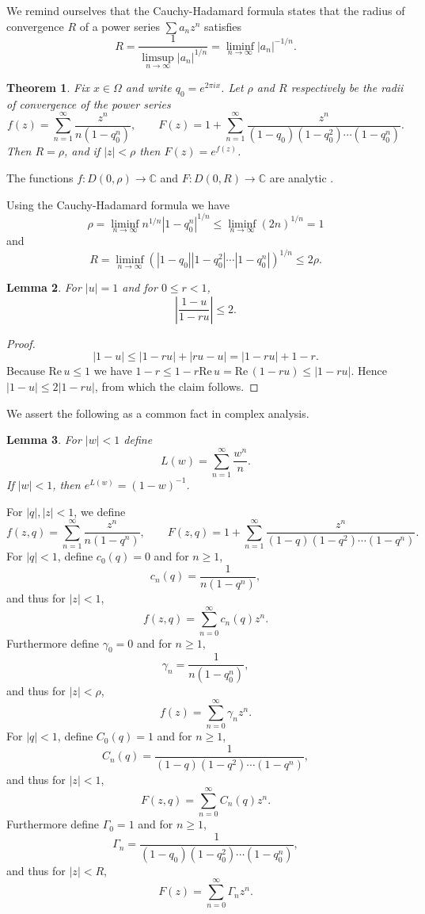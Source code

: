 \documentclass{amsart}
\def\Re{\ensuremath{\mathrm{Re}}\,}
\newtheorem{theorem}{Theorem}
\newtheorem{lemma}[theorem]{Lemma}
\begin{document}
We remind ourselves that the Cauchy-Hadamard formula states that the radius of
convergence $R$ of a  power series $\sum a_n z^n$ satisfies
\[
R =\frac{1}{\limsup_{n \to \infty} |a_n|^{1/n}} =  \liminf_{n \to \infty} |a_n|^{-1/n}.
\]


\begin{theorem}
Fix $x \in \Omega$ and write $q_0=e^{2\pi ix}$. Let $\rho$ and $R$ respectively be   the radii of convergence of the power series
\[
f(z) = \sum_{n=1}^\infty \frac{z^n}{n(1-q_0^n)},\qquad F(z) = 1 + \sum_{n=1}^\infty \frac{z^n}{(1-q_0) (1-q_0^2)\cdots (1-q_0^n)}.
\]
Then $R=\rho$, and if $|z|<\rho$ then $F(z) = e^{f(z)}$. 
\label{efz}
\end{theorem}

The functions $f:D(0,\rho) \to \mathbb{C}$ and $F:D(0,R) \to \mathbb{C}$ are analytic \cite[p.~69, Theorem 2.16]{titchmarsh}.


Using the Cauchy-Hadamard formula we have
\[
\rho = \liminf_{n \to \infty} n^{1/n} |1-q_0^n|^{1/n}
\leq \liminf_{n \to \infty} (2n)^{1/n} = 1
\]
and
\begin{equation}
R = \liminf_{n \to \infty} (|1-q_0| |1-q_0^2| \cdots |1-q_0^n|)^{1/n}
\leq 2\rho.
\label{R2rho}
\end{equation}


\begin{lemma}
For $|u| = 1$ and for $0 \leq r < 1$,
\[
\left| \frac{1-u}{1-ru} \right| \leq 2.
\]
\label{unimodular}
\end{lemma}
\begin{proof}
\[
|1-u| \leq |1-ru| + |ru-u| = |1-ru| + 1-r.
\]
Because $\Re u \leq 1$ we have $1-r \leq 1-r \Re u = \Re(1-ru) \leq |1-ru|$. 
Hence $|1-u| \leq 2|1-ru|$, from which the claim follows.
\end{proof}


We assert the following as a common fact in complex analysis.

\begin{lemma}
For $|w|<1$ define
\[
L(w) = \sum_{n=1}^\infty \frac{w^n}{n}.
\]
If $|w|<1$, then $e^{L(w)} = (1-w)^{-1}$. 
\label{logarithmlemma}
\end{lemma}





For $|q|, |z|<1$, we define
\[
f(z,q) = \sum_{n=1}^\infty \frac{z^n}{n(1-q^n)},\qquad F(z,q) = 1 + \sum_{n=1}^\infty \frac{z^n}{(1-q)(1-q^2)\cdots (1-q^n)}.
\]
For $|q|<1$, define $c_0(q)=0$ and for $n \geq 1$,
\[
c_n(q)=\frac{1}{n(1-q^n)},
\]
and thus for $|z|<1$,
\[
f(z,q) = \sum_{n=0}^\infty c_n(q) z^n.
\]
Furthermore define $\gamma_0=0$ and for $n \geq 1$,
\[
\gamma_n = \frac{1}{n(1-q_0^n)},
\]
and thus for $|z|<\rho$,
\[
f(z) = \sum_{n=0}^\infty \gamma_n z^n.
\]
For $|q|<1$, define $C_0(q)=1$ and for $n \geq 1$,
\[
C_n(q) = \frac{1}{(1-q)(1-q^2) \cdots (1-q^n)},
\]
and thus for $|z|<1$,
\[
F(z,q) = \sum_{n=0}^\infty C_n(q) z^n.
\]
Furthermore define $\Gamma_0=1$ and for $n \geq 1$,
\[
\Gamma_n = \frac{1}{(1-q_0)  (1-q_0^2) \cdots (1-q_0^n)},
\]
and thus for $|z|<R$,
\[
F(z) = \sum_{n=0}^\infty \Gamma_n z^n. 
\]
\end{document}
